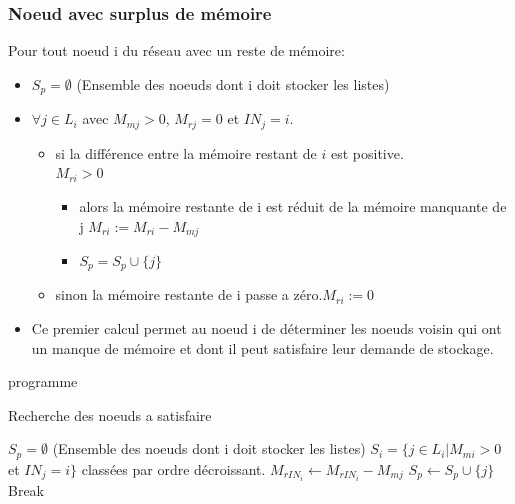 \documentclass[10pt, c]{beamer}
\begin{document}
        \subsubsection{Noeud avec surplus de mémoire}
            \begin{frame}{}
        	    Pour tout noeud i du réseau avec un reste de mémoire:
        	    \begin{itemize}
        	    \item $S_p = \emptyset$ (Ensemble des noeuds dont i doit stocker les listes)
        	        \item   $\forall j \in L_i$ avec $M_{mj} >0$, $M_{rj} = 0$ et $IN_j = i$.
        	        \begin{itemize}
        	            \item si la différence entre la mémoire restant de $i$ est positive.\\
        	            $M_{ri}>0$ 
        	            \begin{itemize}
        	                \item alors la mémoire restante de i est réduit de la mémoire manquante de j  $M_{ri} :=M_{ri} - M_{mj}$
        	                \item $S_p = S_p \cup \{j\}$
        	            \end{itemize}
        	            \item sinon la mémoire restante de i passe a zéro.$ M_{ri}:=0$
        	        \end{itemize}
        	        \item Ce premier calcul permet au noeud i de déterminer les noeuds voisin qui ont un manque de mémoire et dont il peut satisfaire leur demande de stockage. 
        	    \end{itemize}
        	\end{frame}
        	 \begin{frame}{programme}
                \begin{algorithm}[H]
                    \caption{Recherche des noeuds a satisfaire}
                    \begin{algorithmic}
                        \STATE $S_p = \emptyset$ (Ensemble des noeuds dont i doit stocker les listes)
                        \STATE $S_{i} = \{ j \in L_i | M_{mi} >0$ et $IN_j = i \} $ classées par ordre décroissant.
                                \STATE $ M_{rIN_{i}} \leftarrow M_{rIN_{i}} - M_{mj}$
                                \STATE $ S_p \leftarrow S_p \cup \{j\}$
                            \ELSE 
                                \STATE Break
                            \ENDIF
                        \ENDFOR
                    \end{algorithmic}
                \end{algorithm}
            \end{frame}
\end{document}
